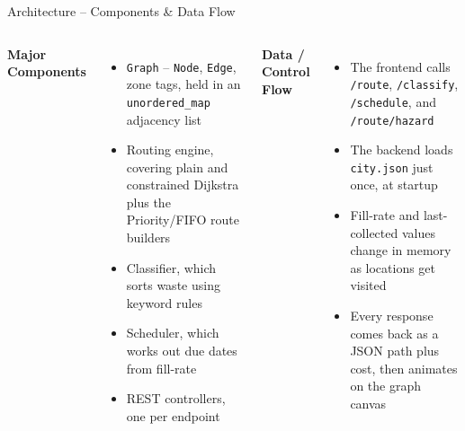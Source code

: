 \documentclass[aspectratio=169,11pt]{beamer}
\begin{document}
\begin{frame}{Architecture -- Components \& Data Flow}
\begin{columns}[T,totalwidth=\textwidth]
\small
\textbf{\color{GEUBlue}Major Components}
\begin{itemize}\itemsep2pt
\item \texttt{Graph} -- \texttt{Node}, \texttt{Edge}, zone tags, held in an \texttt{unordered\_map} adjacency list
\item Routing engine, covering plain and constrained Dijkstra plus the Priority/FIFO route builders
\item Classifier, which sorts waste using keyword rules
\item Scheduler, which works out due dates from fill-rate
\item REST controllers, one per endpoint
\end{itemize}
\small
\textbf{\color{GEUBlue}Data / Control Flow}
\begin{itemize}\itemsep2pt
\item The frontend calls \texttt{/route}, \texttt{/classify}, \texttt{/schedule}, and \texttt{/route/hazard}
\item The backend loads \texttt{city.json} just once, at startup
\item Fill-rate and last-collected values change in memory as locations get visited
\item Every response comes back as a JSON path plus cost, then animates on the graph canvas
\end{itemize}
\end{columns}
\end{frame}
\end{document}
